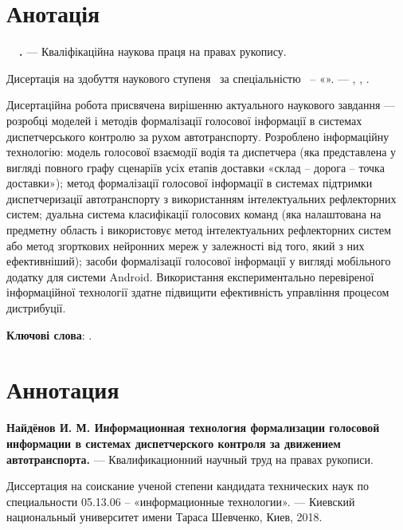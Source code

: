 \section*{Анотація}

\textbf{\thesisAuthorLastName~\thesisAuthorInitials\ \thesisTitle.} --- Кваліфікаційна наукова праця на
правах рукопису.

Дисертація на здобуття наукового ступеня \thesisDegree\ за
спеціальністю \thesisSpecialtyNumber\ – «\thesisSpecialtyTitle». --- \thesisOrganizationDone, \thesisCity, \thesisYear.

Дисертаційна робота присвячена вирішенню актуального наукового завдання --- розробці моделей і методів формалізації голосової інформації в системах диспетчерського контролю за рухом автотранспорту. Розроблено інформаційну технологію: модель голосової взаємодії водія та диспетчера (яка представлена у вигляді повного графу сценаріїв усіх етапів доставки «склад – дорога – точка доставки»); метод формалізації голосової інформації в системах підтримки диспетчеризації автотранспорту з використанням інтелектуальних рефлекторних систем; дуальна система класифікації голосових команд (яка налаштована на предметну область і використовує метод інтелектуальних рефлекторних систем або метод згорткових нейронних мереж у залежності від того, який з них ефективніший); засоби формалізації голосової інформації у вигляді мобільного додатку для системи Android. Використання експериментально перевіреної інформаційної технології здатне підвищити ефективність управління процесом дистрибуції.

\textbf{Ключові слова}: \keywords.

\section*{Аннотация}

\textbf{Найдёнов И. М. Информационная технология формализации голосовой информации в системах диспетчерского контроля за движением автотранспорта.} --- Квалификационний научный труд на правах рукописи.

Диссертация на соискание ученой степени кандидата технических наук по специальности 05.13.06 -- «информационные технологии». --- Киевский национальный университет имени Тараса Шевченко, Киев, 2018.

